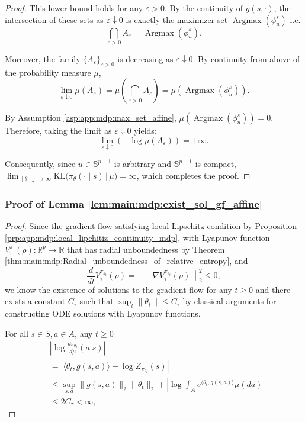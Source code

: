 \documentclass{amsart}
\theoremstyle{definition}
\begin{document}
\begin{proof}
This lower bound holds for any $\varepsilon > 0$. By the continuity of $g(s,\cdot)$, the intersection of these sets as $\varepsilon \downarrow 0$ is exactly the maximizer set $\operatorname{Argmax}(\phi^s_u)$ i.e.
\[
\bigcap_{\varepsilon > 0} A_\varepsilon
=
\operatorname{Argmax}(\phi^s_u).
\]

Moreover, the family $\{A_\varepsilon\}_{\varepsilon > 0}$ is decreasing as
$\varepsilon \downarrow 0$.
By continuity from above of the probability measure $\mu$,
\[
\lim_{\varepsilon \downarrow 0} \mu(A_\varepsilon)
=
\mu\!\left( \bigcap_{\varepsilon > 0} A_\varepsilon \right)
=
\mu(\operatorname{Argmax}(\phi^s_u)).
\]

By Assumption \ref{asp:app:mdp:max_set_affine}, $\mu(\operatorname{Argmax}(\phi^s_u)) = 0$. Therefore, taking the limit as $\varepsilon \downarrow 0$ yields:
\[
\lim_{\varepsilon \downarrow 0} (-\log \mu(A_\varepsilon)) = +\infty.
\]

Consequently, since $u \in \mathbb{S}^{p-1}$ is arbitrary and $\mathbb{S}^{p-1}$ is compact, $\lim_{\|\theta\|_2\to\infty}
\mathrm{KL}\bigl(\pi_\theta(\cdot\mid s)\,|\,\mu\bigr)=\infty$, which completes the proof.
\end{proof}


\subsubsection{Proof of Lemma \ref{lem:main:mdp:exist_sol_gf_affine}}
\label{sec:pf_exist_sol_gf_affine}
\ExistSolAffine*

\begin{proof}
Since the gradient flow satisfying local Lipschitz condition by Proposition \ref{prp:app:mdp:local_lipchitiz_conitinuity_mdp}, with Lyapunov function $V_\tau^{\pi_{\cdot}}(\rho): \mathbb{R}^p \rightarrow \mathbb{R}$ that has radial unboundedness by Theorem \ref{thm:main:mdp:Radial_unboundedness_of_relative_entropy}, and
\[
\frac{d}{dt}V_\tau^{\pi_{\theta_t}}(\rho)=-\left\|\nabla V_\tau^{\pi_{\theta_t}}(\rho)\right\|_2^2 \leq 0,
\]
we know the existence of solutions to the gradient flow for any $ t \geq 0$ and there exists a constant $C_\tau$ such that $\sup_t\|\theta_t\| \leq C_\tau $ by classical arguments for constructing ODE solutions with Lyapunov functions.

For all $s \in S, a \in A$, any $t \geq 0$
\begin{align*}
&\left|\log\frac{d \pi_{\theta_t}}{d \mu}(a|s)\right|\\
& = \left| \langle \theta_t, g(s,a)\rangle - \log Z_{\pi_{\theta_t}}(s)\right| \\
& \leq \sup_{s,a}\|g(s,a)\|_2\|\theta_t\|_2 + \left|\log \int_{A} e^{\langle \theta_t,g(s,a)\rangle}\mu(da)\right|\\
& \leq 2C_\tau < \infty,
\end{align*}
\end{proof}
\end{document}
